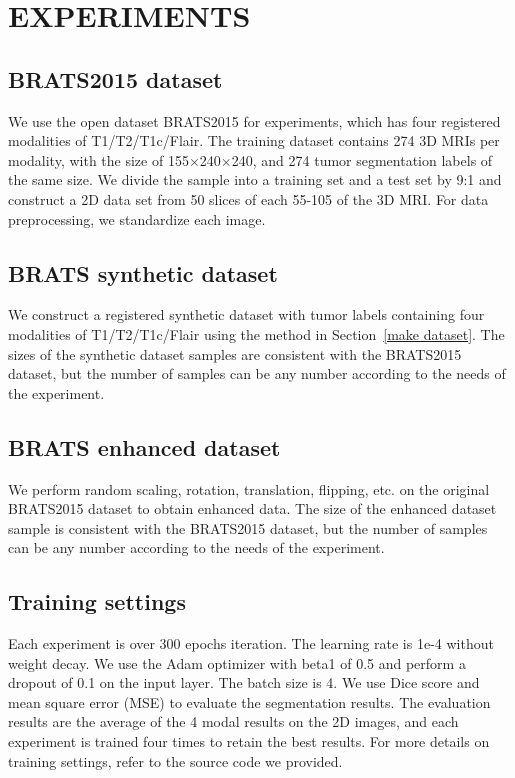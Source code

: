 \documentclass[runningheads]{llncs}
\begin{document}
\section{EXPERIMENTS}

\subsection{BRATS2015 dataset}
We use the open dataset BRATS2015\cite{91menze:hal-00935640} for experiments, which has four registered modalities of T1/T2/T1c/Flair. The training dataset contains 274 3D MRIs per modality, with the size of 155$\times$240$\times$240, and 274 tumor segmentation labels of the same size. We divide the sample into a training set and a test set by 9:1 and construct a 2D data set from 50 slices of each 55-105 of the 3D MRI. For data preprocessing, we standardize each image.

\subsection{BRATS synthetic dataset}
We construct a registered synthetic dataset with tumor labels containing four modalities of T1/T2/T1c/Flair using the method in Section~\ref{make dataset}. The sizes of the synthetic dataset samples are consistent with the BRATS2015 dataset, but the number of samples can be any number according to the needs of the experiment.

\subsection{BRATS enhanced dataset}
We perform random scaling, rotation, translation, flipping, etc. on the original BRATS2015 dataset to obtain enhanced data. The size of the enhanced dataset sample is consistent with the BRATS2015 dataset, but the number of samples can be any number according to the needs of the experiment.

\subsection{Training settings}
Each experiment is over 300 epochs iteration. 
The learning rate is 1e-4 without weight decay. 
We use the Adam optimizer with beta1 of 0.5 and perform a dropout of 0.1 on the input layer. The batch size is 4. 
We use Dice score \cite{95dice1945measures} and mean square error (MSE)\cite{94prasad1990the} to evaluate the segmentation results. The evaluation results are the average of the 4 modal results on the 2D images, and each experiment is trained four times to retain the best results. For more details on training settings, refer to the source code we provided.
\end{document}
